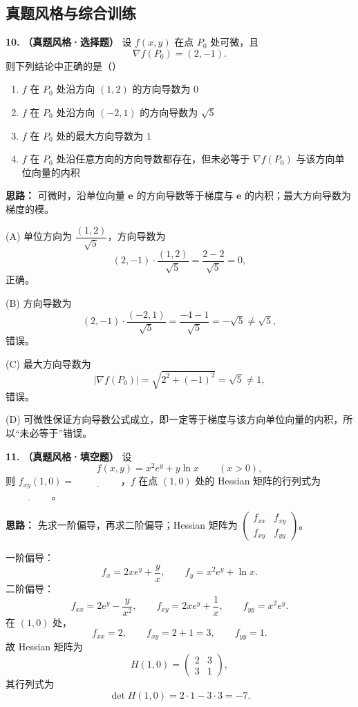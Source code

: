\subsection{真题风格与综合训练}

\textbf{10.} \textbf{（真题风格·选择题）} 设 \(f(x,y)\) 在点 \(P_0\) 处可微，且
\[
\nabla f(P_0)=(2,-1).
\]
则下列结论中正确的是（\quad）

\begin{enumerate}[label=(\Alph*),itemsep=2pt,topsep=2pt]
    \item \(f\) 在 \(P_0\) 处沿方向 \((1,2)\) 的方向导数为 \(0\)
    \item \(f\) 在 \(P_0\) 处沿方向 \((-2,1)\) 的方向导数为 \(\sqrt5\)
    \item \(f\) 在 \(P_0\) 处的最大方向导数为 \(1\)
    \item \(f\) 在 \(P_0\) 处沿任意方向的方向导数都存在，但未必等于 \(\nabla f(P_0)\) 与该方向单位向量的内积
\end{enumerate}

\ifshowsolutions%
\textbf{思路：} 可微时，沿单位向量 \(\mathbf e\) 的方向导数等于梯度与 \(\mathbf e\) 的内积；最大方向导数为梯度的模。

(A) 单位方向为 \(\dfrac{(1,2)}{\sqrt5}\)，方向导数为
\[
(2,-1)\cdot\frac{(1,2)}{\sqrt5}=\frac{2-2}{\sqrt5}=0,
\]
正确。

(B) 方向导数为
\[
(2,-1)\cdot\frac{(-2,1)}{\sqrt5}=\frac{-4-1}{\sqrt5}=-\sqrt5\neq\sqrt5,
\]
错误。

(C) 最大方向导数为
\[
|\nabla f(P_0)|=\sqrt{2^2+(-1)^2}=\sqrt5\neq1,
\]
错误。

(D) 可微性保证方向导数公式成立，即一定等于梯度与该方向单位向量的内积，所以“未必等于”错误。

\else \answerarea[4] \fi%

\textbf{11.} \textbf{（真题风格·填空题）} 设
\[
f(x,y)=x^2e^y+y\ln x\qquad(x>0),
\]
则 \(f_{xy}(1,0)=\underline{\hspace{2cm}}\)，\(f\) 在点 \((1,0)\) 处的 Hessian 矩阵的行列式为 \(\underline{\hspace{2cm}}\)。

\ifshowsolutions%
\textbf{思路：} 先求一阶偏导，再求二阶偏导；Hessian 矩阵为
\(\begin{pmatrix}f_{xx}&f_{xy}\\ f_{xy}&f_{yy}\end{pmatrix}\)。

一阶偏导：
\[
f_x=2xe^y+\frac{y}{x},\qquad
f_y=x^2e^y+\ln x.
\]
二阶偏导：
\[
f_{xx}=2e^y-\frac{y}{x^2},\qquad
f_{xy}=2xe^y+\frac1x,\qquad
f_{yy}=x^2e^y.
\]
在 \((1,0)\) 处，
\[
f_{xx}=2,\qquad f_{xy}=2+1=3,\qquad f_{yy}=1.
\]
故 Hessian 矩阵为
\[
H(1,0)=\begin{pmatrix}2&3\\3&1\end{pmatrix},
\]
其行列式为
\[
\det H(1,0)=2\cdot1-3\cdot3=-7.
\]

